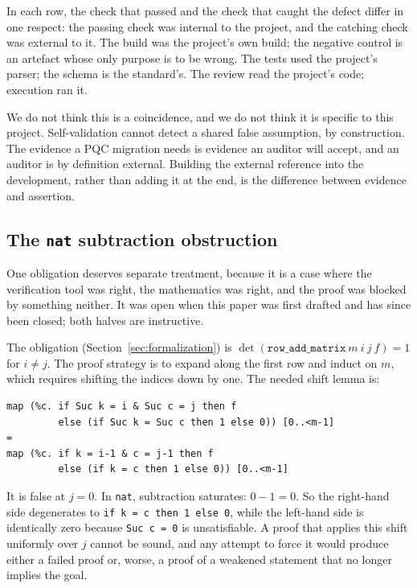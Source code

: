 In each row, the check that passed and the check that caught the defect differ in
one respect: the passing check was internal to the project, and the catching
check was external to it. The build was the project's own build; the negative
control is an artefact whose only purpose is to be wrong. The tests used the
project's parser; the schema is the standard's. The review read the project's
code; execution ran it.

We do not think this is a coincidence, and we do not think it is specific to
this project. Self-validation cannot detect a shared false assumption, by
construction. The evidence a PQC migration needs is evidence an auditor will
accept, and an auditor is by definition external. Building the external reference
into the development, rather than adding it at the end, is the difference between
evidence and assertion.

\subsection{The \texttt{nat} subtraction obstruction}
\label{sec:case-study-nat}

One obligation deserves separate treatment, because it is a case where the
verification tool was right, the mathematics was right, and the proof was
blocked by something neither. It was open when this paper was first drafted and
has since been closed; both halves are instructive.

The obligation (Section~\ref{sec:formalization}) is
$\det(\texttt{row\_add\_matrix}\ m\ i\ j\ f) = 1$ for $i \neq j$. The proof
strategy is to expand along the first row and induct on $m$, which requires
shifting the indices down by one. The needed shift lemma is:

\begin{lstlisting}
map (%c. if Suc k = i & Suc c = j then f
         else (if Suc k = Suc c then 1 else 0)) [0..<m-1]
=
map (%c. if k = i-1 & c = j-1 then f
         else (if k = c then 1 else 0)) [0..<m-1]
\end{lstlisting}

It is false at $j = 0$. In \texttt{nat}, subtraction saturates:
$0 - 1 = 0$. So the right-hand side degenerates to
\texttt{if k = c then 1 else 0}, while the left-hand side is identically zero
because \texttt{Suc c = 0} is unsatisfiable. A proof that applies this shift
uniformly over $j$ cannot be sound, and any attempt to force it would produce
either a failed proof or, worse, a proof of a weakened statement that no longer
implies the goal.

